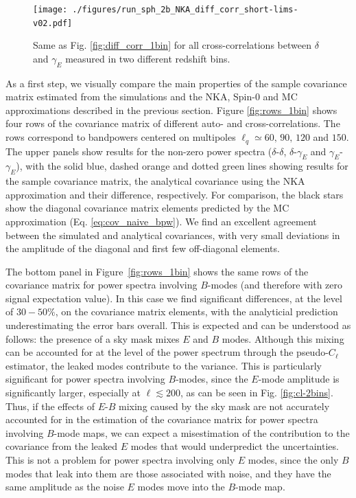 \documentclass[a4paper,11pt]{article}
\begin{document}
      \begin{figure}
        \centering
        \texttt{[image: ./figures/run\_sph\_2b\_NKA\_diff\_corr\_short-lims-v02.pdf]}
        \caption{Same as Fig. \ref{fig:diff_corr_1bin} for all cross-correlations between $\delta$ and $\gamma_E$ measured in two different redshift bins.}
        \label{fig:corr_diff_2bins}
      \end{figure}
      As a first step, we visually compare the main properties of the sample covariance matrix estimated from the simulations and the NKA, Spin-0 and MC approximations described in the previous section. Figure \ref{fig:rows_1bin} shows four rows of the covariance matrix of different auto- and cross-correlations. The rows correspond to bandpowers centered on multipoles $\ell_q\simeq60,\,90,\,120$ and $150$. The upper panels show results for the non-zero power spectra ($\delta$-$\delta$, $\delta$-$\gamma_E$ and $\gamma_E$-$\gamma_E$), with the solid blue, dashed orange and dotted green lines showing results for the sample covariance matrix, the analytical covariance using the NKA approximation and their difference, respectively. For comparison, the black stars show the diagonal covariance matrix elements predicted by the MC approximation (Eq. \ref{eq:cov_naive_bpw}). We find an excellent agreement between the simulated and analytical covariances, with very small deviations in the amplitude of the diagonal and first few off-diagonal elements.
      
      The bottom panel in Figure~\ref{fig:rows_1bin} shows the same rows of the covariance matrix for power spectra involving $B$-modes (and therefore with zero signal expectation value). In this case we find significant differences, at the level of $30-50\%$, on the covariance matrix elements, with the analyticial prediction underestimating the error bars overall. This is expected and can be understood as follows: the presence of a sky mask mixes $E$ and $B$ modes. Although this mixing can be accounted for at the level of the power spectrum through the pseudo-$C_\ell$ estimator, the leaked modes contribute to the variance. This is particularly significant for power spectra involving $B$-modes, since the $E$-mode amplitude is significantly larger, especially at $\ell\lesssim200$, as can be seen in Fig. \ref{fig:cl-2bins}. Thus, if the effects of $E$-$B$ mixing caused by the sky mask are not accurately accounted for in the estimation of the covariance matrix for power spectra involving $B$-mode maps, we can expect a misestimation of the contribution to the covariance from the leaked $E$ modes that would underpredict the uncertainties. This is not a problem for power spectra involving only $E$ modes, since the only $B$ modes that leak into them are those associated with noise, and they have the same amplitude as the noise $E$ modes move into the $B$-mode map.
\end{document}
